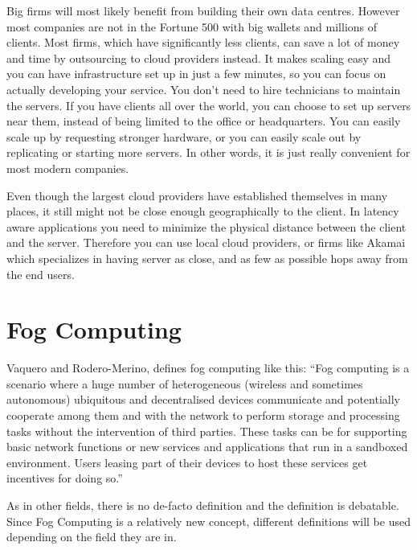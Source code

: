 Big firms will most likely benefit from building their own data centres. However most companies are not in the Fortune 500 with big wallets and millions of clients. Most firms, which have significantly less clients, can save a lot of money and time by outsourcing to cloud providers instead. It makes scaling easy and you can have infrastructure set up in just a few minutes, so you can focus on actually developing your service. You don't need to hire technicians to maintain the servers. If you have clients all over the world, you can choose to set up servers near them, instead of being limited to the office or headquarters. You can easily scale up by requesting stronger hardware, or you can easily scale out by replicating or starting more servers. In other words, it is just really convenient for most modern companies.

Even though the largest cloud providers have established themselves in many places, it still might not be close enough geographically to the client. In latency aware applications you need to minimize the physical distance between the client and the server. Therefore you can use local cloud providers, or firms like Akamai which specializes in having server as close, and as few as possible hops away from the end users.










\section{Fog Computing}

Vaquero and Rodero-Merino\cite{vaquero_finding_2014}, defines fog computing like this: 
“Fog computing is a scenario where a huge number of heterogeneous (wireless and sometimes autonomous) ubiquitous and decentralised devices communicate and potentially cooperate among them and with the network to perform storage and processing tasks without the intervention of third parties. These tasks can be for supporting basic network functions or new services and applications that run in a sandboxed environment. Users leasing part of their devices to host these services get incentives for doing so.”

As in other fields, there is no de-facto definition and the definition is debatable. Since Fog Computing is a relatively new concept, different definitions will be used depending on the field they are in.

